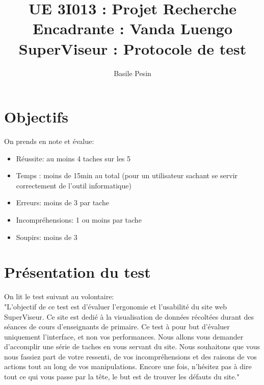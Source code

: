 \documentclass{article}
\title{UE 3I013 : Projet Recherche\\
    Encadrante : Vanda Luengo\\
    SuperViseur : Protocole de test}
\author{Basile Pesin}
\begin{document}
\maketitle

\section{Objectifs}
On prends en note et évalue:
\begin{itemize}
    \item Réussite: au moins 4 taches sur les 5
    \item Temps : moins de 15min au total (pour un utilisateur sachant se servir correctement de l'outil informatique)
    \item Erreurs: moins de 3 par tache
    \item Incompréhensions: 1 ou moins par tache
    \item Soupirs: moins de 3
\end{itemize}

\section{Présentation du test}
On lit le test suivant au volontaire:\\
"L'objectif de ce test est d'évaluer l'ergonomie et l'usabilité du site web SuperViseur. Ce site est dedié à la visualisation de données récoltées durant des séances de cours d'enseignants de primaire. Ce test à pour but d'évaluer uniquement l'interface, et non vos performances.
Nous allons vous demander d'accomplir une série de taches en vous servant du site. Nous souhaitons que vous nous fassiez part de votre ressenti, de vos incompréhensions et des raisons de vos actions tout au long de vos manipulations. Encore une fois, n'hésitez pas à dire tout ce qui vous passe par la tête, le but est de trouver les défauts du site."
\end{document}
